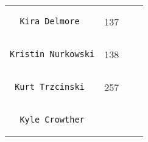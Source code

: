 \documentclass[]{article}
\begin{document}
\begin{longtable}[c]{@{}llll@{}}
\begin{minipage}[t]{0.39\columnwidth}
\begin{verbatim}
  Kira Delmore
\end{verbatim}
\end{minipage} & \begin{minipage}[t]{0.10\columnwidth}\raggedright
137
\end{minipage} & \begin{minipage}[t]{0.13\columnwidth}\raggedright
\end{minipage} & \begin{minipage}[t]{0.15\columnwidth}\raggedright
\end{minipage}
\\\noalign{\medskip}
\begin{minipage}[t]{0.39\columnwidth}\raggedright
\begin{verbatim}
Kristin Nurkowski
\end{verbatim}
\end{minipage} & \begin{minipage}[t]{0.10\columnwidth}\raggedright
138
\end{minipage} & \begin{minipage}[t]{0.13\columnwidth}\raggedright
\end{minipage} & \begin{minipage}[t]{0.15\columnwidth}\raggedright
\end{minipage}
\\\noalign{\medskip}
\begin{minipage}[t]{0.39\columnwidth}\raggedright
\begin{verbatim}
 Kurt Trzcinski
\end{verbatim}
\end{minipage} & \begin{minipage}[t]{0.10\columnwidth}\raggedright
257
\end{minipage} & \begin{minipage}[t]{0.13\columnwidth}\raggedright
\end{minipage} & \begin{minipage}[t]{0.15\columnwidth}\raggedright
\end{minipage}
\\\noalign{\medskip}
\begin{minipage}[t]{0.39\columnwidth}\raggedright
\begin{verbatim}
  Kyle Crowther
\end{verbatim}
\end{minipage} & \begin{minipage}[t]{0.10\columnwidth}\raggedright

\end{minipage}
\end{longtable}
\end{document}
